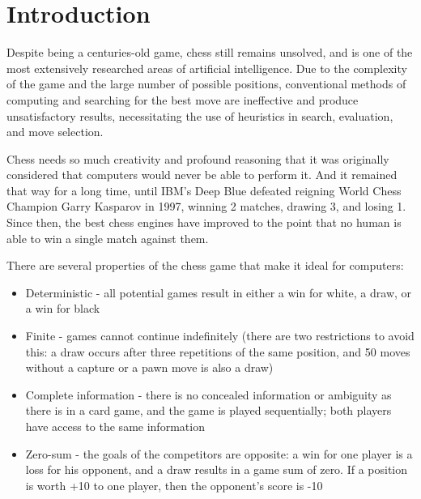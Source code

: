 \chapter{Introduction}
\label{intro}


Despite being a centuries-old game, chess still remains unsolved, and is one of the most extensively researched areas of artificial intelligence. Due to the complexity of the game and the large number of possible positions, conventional methods of computing and searching for the best move are ineffective and produce unsatisfactory results, necessitating the use of heuristics in search, evaluation, and move selection.

Chess needs so much creativity and profound reasoning that it was originally considered that computers would never be able to perform it. And it remained that way for a long time, until IBM's Deep Blue \cite{campbell2002deep} defeated reigning World Chess Champion Garry Kasparov in 1997, winning 2 matches, drawing 3, and losing 1. Since then, the best chess engines have improved to the point that no human is able to win a single match against them.


There are several properties of the chess game that make it ideal for computers:
\begin{itemize}
    \item Deterministic - all potential games result in either a win for white, a draw, or a win for black
    \item Finite - games cannot continue indefinitely (there are two restrictions to avoid this: a draw occurs after three repetitions of the same position, and 50 moves without a capture or a pawn move is also a draw)
    \item Complete information - there is no concealed information or ambiguity as there is in a card game, and the game is played sequentially; both players have access to the same information
    \item Zero-sum - the goals of the competitors are opposite: a win for one player is a loss for his opponent, and a draw results in a game sum of zero. If a position is worth +10 to one player, then the opponent's score is -10
\end{itemize}

